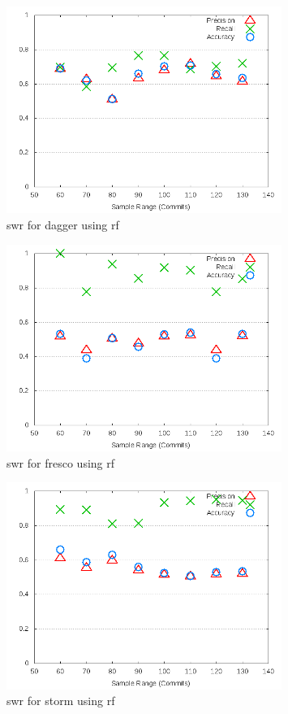 \begin{figure}[!ht]
    \centering
        \includegraphics[width=0.8\textwidth]{images/rf/test_1/dagger_sample_range}
        \caption{\gls{swr} for dagger using \gls{rf}}
        \label{fig:test_1_dagger_rf}
\end{figure}


\begin{figure}[!ht]
    \centering

        \includegraphics[width=0.8\textwidth]{images/rf/test_1/fresco_sample_range}
        \caption{\gls{swr} for fresco using \gls{rf}}
        \label{fig:test_1_fresco_rf}
\end{figure}

\begin{figure}[!ht]
    \centering
        \includegraphics[width=0.8\textwidth]{images/rf/test_1/storm_sample_range}
        \caption{\gls{swr} for storm using \gls{rf}}
        \label{fig:test_1_storm_rf}
\end{figure}

